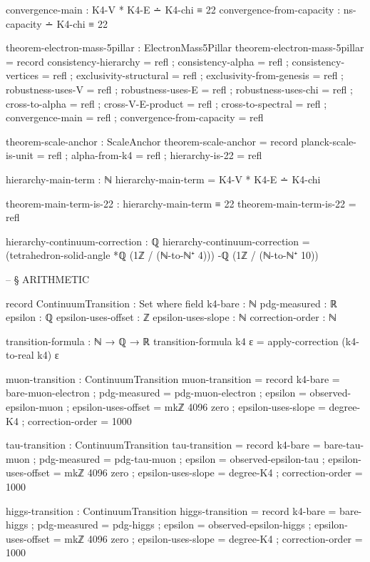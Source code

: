 \documentclass[11pt,a4paper]{book}
\begin{document}
\begin{code}
    convergence-main : K4-V * K4-E ∸ K4-chi ≡ 22
    convergence-from-capacity : ns-capacity ∸ K4-chi ≡ 22

theorem-electron-mass-5pillar : ElectronMass5Pillar
theorem-electron-mass-5pillar = record
  { consistency-hierarchy = refl
  ; consistency-alpha = refl
  ; consistency-vertices = refl
  ; exclusivity-structural = refl
  ; exclusivity-from-genesis = refl
  ; robustness-uses-V = refl
  ; robustness-uses-E = refl
  ; robustness-uses-chi = refl
  ; cross-to-alpha = refl
  ; cross-V-E-product = refl
  ; cross-to-spectral = refl
  ; convergence-main = refl
  ; convergence-from-capacity = refl
  }

theorem-scale-anchor : ScaleAnchor
theorem-scale-anchor = record
  { planck-scale-is-unit = refl
  ; alpha-from-k4 = refl
  ; hierarchy-is-22 = refl
  }

hierarchy-main-term : ℕ
hierarchy-main-term = K4-V * K4-E ∸ K4-chi

theorem-main-term-is-22 : hierarchy-main-term ≡ 22
theorem-main-term-is-22 = refl

hierarchy-continuum-correction : ℚ
hierarchy-continuum-correction = 
  (tetrahedron-solid-angle *ℚ (1ℤ / (ℕ-to-ℕ⁺ 4)))
  -ℚ (1ℤ / (ℕ-to-ℕ⁺ 10))


-- § ARITHMETIC

record ContinuumTransition : Set where
  field
    k4-bare : ℕ
    pdg-measured : ℝ
    epsilon : ℚ
    epsilon-uses-offset : ℤ
    epsilon-uses-slope : ℕ
    correction-order : ℕ

transition-formula : ℕ → ℚ → ℝ
transition-formula k4 ε = apply-correction (k4-to-real k4) ε

muon-transition : ContinuumTransition
muon-transition = record
  { k4-bare = bare-muon-electron
  ; pdg-measured = pdg-muon-electron
  ; epsilon = observed-epsilon-muon
  ; epsilon-uses-offset = mkℤ 4096 zero
  ; epsilon-uses-slope = degree-K4
  ; correction-order = 1000
  }

tau-transition : ContinuumTransition
tau-transition = record
  { k4-bare = bare-tau-muon
  ; pdg-measured = pdg-tau-muon
  ; epsilon = observed-epsilon-tau
  ; epsilon-uses-offset = mkℤ 4096 zero
  ; epsilon-uses-slope = degree-K4
  ; correction-order = 1000
  }

higgs-transition : ContinuumTransition
higgs-transition = record
  { k4-bare = bare-higgs
  ; pdg-measured = pdg-higgs
  ; epsilon = observed-epsilon-higgs
  ; epsilon-uses-offset = mkℤ 4096 zero
  ; epsilon-uses-slope = degree-K4
  ; correction-order = 1000
  }


\end{code}
\end{document}
